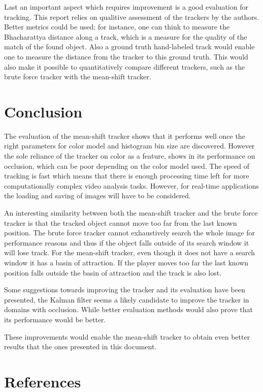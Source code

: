 \documentclass[a4paper,11pt]{article}
\begin{document}
Last an important aspect which requires improvement is a good evaluation for tracking. This report relies on qualitive assessment of the trackers by the authors. Better metrics could be used; for instance, one can think to measure the Bhacharattya distance along a track, which is a measure for the quality of the match of the found object. Also a ground truth hand-labeled track would enable one to measure the distance from the tracker to this ground truth. This would also make it possible to quantitatively compare different trackers, such as the brute force tracker with the mean-shift tracker.


\section{Conclusion} \label{sec:conc}
The evaluation of the mean-shift tracker shows that it performs well once the right parameters for color model and histogram bin size are discovered. However the sole reliance of the tracker on color as a feature, shows in its performance on occlusion, which can be poor depending on the color model used. The speed of tracking is fast which means that there is enough processing time left for more computationally complex video analysis tasks. However, for real-time applications the loading and saving of images will have to be considered. 

An interesting similarity between both the mean-shift tracker and the brute force tracker is that the tracked object cannot move too far from the last known position. The brute force tracker cannot exhaustively search the whole image for performance reasons and thus if the object falls outside of its search window it will lose track. For the mean-shift tracker, even though it does not have a search window it has a basin of attraction. If the player moves too far the last known position falls outside the basin of attraction and the track is also lost.

Some suggestions towards improving the tracker and its evaluation have been presented, the Kalman filter seems a likely candidate to improve the tracker in domains with occlusion. While better evaluation methods would also prove that its performance would be better.
 
These improvements would enable the mean-shift tracker to obtain even better results that the ones presented in this document. 
\section{References} 


\renewcommand\bibname{References}


\end{document}

